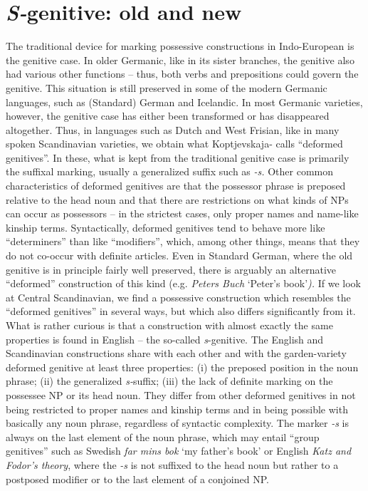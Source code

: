 \section{\textit{S-}genitive: old and new}

\begin{styleBodyTextFirst}
The traditional device for marking possessive constructions in Indo-European is the genitive case. In older Germanic, like in its sister branches, the genitive also had various other functions – thus, both verbs and prepositions could govern the genitive. This situation is still preserved in some of the modern Germanic languages, such as (Standard) German and Icelandic. In most Germanic varieties, however, the genitive case has either been transformed or has disappeared altogether. Thus, in languages such as Dutch and West Frisian, like in many spoken Scandinavian varieties, we obtain what Koptjevskaja-\citet{Tamm2003} calls “deformed genitives”. In these, what is kept from the traditional genitive case is primarily the suffixal marking, usually a generalized suffix such as\textit{ -s}\textit{. }Other common characteristics of deformed genitives are that the possessor phrase is preposed relative to the head noun and that there are restrictions on what kinds of NPs can occur as possessors – in the strictest cases, only proper names and name-like kinship terms. Syntactically, deformed genitives tend to behave more like “determiners” than like “modifiers”, which, among other things, means that they do not co-occur with definite articles. Even in Standard German, where the old genitive is in principle fairly well preserved, there is arguably an alternative “deformed” construction of this kind (e.g. \textit{Peters Buch }‘Peter’s book’\textit{).} If we look at Central Scandinavian, we find a possessive construction which resembles the “deformed genitives” in several ways, but which also differs significantly from it. What is rather curious is that a construction with almost exactly the same properties is found in English – the so-called \textit{s}{}-genitive. The English and Scandinavian constructions share with each other and with the garden-variety deformed genitive at least three properties: (i) the preposed position in the noun phrase; (ii) the generalized \textit{s-}suffix; (iii) the lack of definite marking on the possessee NP or its head noun. They differ from other deformed genitives in not being restricted to proper names and kinship terms and in being possible with basically any noun phrase, regardless of syntactic complexity. The marker\textit{ -s} is always on the last element of the noun phrase, which may entail “group genitives” such as Swedish \textit{far mins bok} ‘my father’s book’ or English \textit{Katz and Fodor’s theory}, where the\textit{ -s} is not suffixed to the head noun but rather to a postposed modifier or to the last element of a conjoined NP. 

\end{styleBodyTextFirst}

